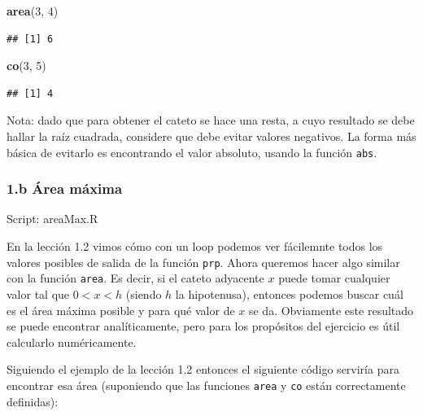 \documentclass[]{article}
\newenvironment{Shaded}{}{}
\newcommand{\KeywordTok}[1]{\textcolor[rgb]{0.00,0.44,0.13}{\textbf{{#1}}}}
\newcommand{\DecValTok}[1]{\textcolor[rgb]{0.25,0.63,0.44}{{#1}}}
\newcommand{\NormalTok}[1]{{#1}}
\begin{document}
\begin{Shaded}
\begin{Highlighting}[]
\KeywordTok{area}\NormalTok{(}\DecValTok{3}\NormalTok{, }\DecValTok{4}\NormalTok{)}
\end{Highlighting}
\end{Shaded}
\begin{verbatim}
## [1] 6
\end{verbatim}
\begin{Shaded}
\begin{Highlighting}[]
\KeywordTok{co}\NormalTok{(}\DecValTok{3}\NormalTok{, }\DecValTok{5}\NormalTok{)}
\end{Highlighting}
\end{Shaded}
\begin{verbatim}
## [1] 4
\end{verbatim}
Nota: dado que para obtener el cateto se hace una resta, a cuyo
resultado se debe hallar la raíz cuadrada, considere que debe evitar
valores negativos. La forma más básica de evitarlo es encontrando el
valor absoluto, usando la función \texttt{abs}.

\subsubsection{1.b Área máxima}

Script: areaMax.R

En la lección 1.2 vimos cómo con un loop podemos ver fácilemnte todos
los valores posibles de salida de la función \texttt{prp}. Ahora
queremos hacer algo similar con la función \texttt{area}. Es decir, si
el cateto adyacente $x$ puede tomar cualquier valor tal que $0 < x < h$
(siendo $h$ la hipotenusa), entonces podemos buscar cuál es el área
máxima posible y para qué valor de $x$ se da. Obviamente este resultado
se puede encontrar analíticamente, pero para los propósitos del
ejercicio es útil calcularlo numéricamente.

Siguiendo el ejemplo de la lección 1.2 entonces el siguiente código
serviría para encontrar esa área (suponiendo que las funciones
\texttt{area} y \texttt{co} están correctamente definidas):
\end{document}
